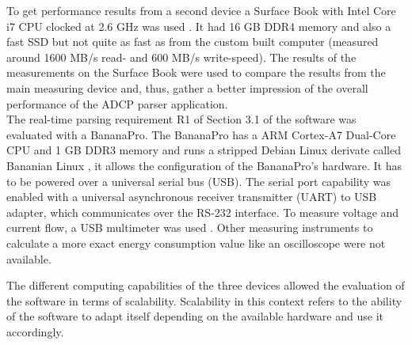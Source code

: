 To get performance results from a second device a Surface Book with Intel Core i7 CPU clocked at 2.6 GHz was used \cite{sb}. It had 16 GB DDR4 memory and also a fast SSD but not quite as fast as from the custom built computer (measured around 1600 MB/s read- and 600 MB/s write-speed). The results of the measurements on the Surface Book were used to compare the results from the main measuring device and, thus, gather a better impression of the overall performance of the ADCP parser application.\\
The real-time parsing requirement R1 of Section 3.1 of the software was evaluated with a BananaPro. The BananaPro has a ARM Cortex-A7 Dual-Core CPU and 1 GB DDR3 memory \cite{bpro} and runs a stripped Debian Linux derivate called Bananian Linux \cite{bananian}, it allows the configuration of the BananaPro's hardware. It has to be powered over a universal serial bus (USB). The serial port capability was enabled with a universal asynchronous receiver transmitter (UART) to USB adapter, which communicates over the RS-232 interface. To measure voltage and current flow, a USB multimeter was used \cite{mul}. Other measuring instruments to calculate a more exact energy consumption value like an oscilloscope were not available.

The different computing capabilities of the three devices allowed the evaluation of the software in terms of scalability. Scalability in this context refers to the ability of the software to adapt itself depending on the available hardware and use it accordingly.
